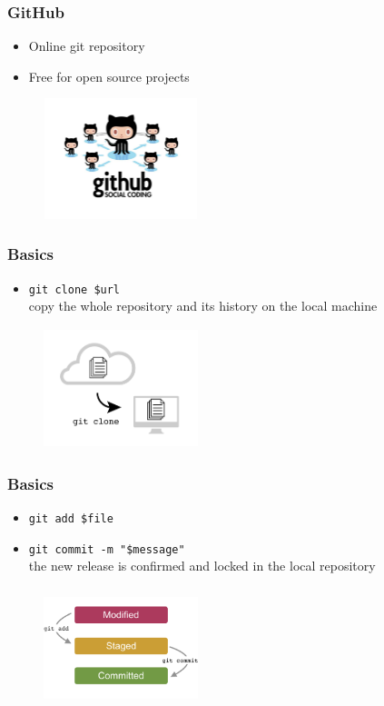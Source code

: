 \documentclass{beamer}
\begin{document}
\begin{frame}
\frametitle{GitHub}
\begin{itemize}
\item Online git repository
\item Free for open source projects
\end{itemize}
\begin{figure}
\centering
\includegraphics[height=3.5cm, width=4.5cm]{github_logo}
\end{figure}
\end{frame}

\begin{frame}[fragile]
\frametitle{Basics}
\begin{itemize}
\item \verb!git clone $url! \\ 
copy the whole repository and its history on the local machine
\end{itemize}
\begin{figure}
\centering
\includegraphics[height=3.5cm, width=4.5cm]{clone}
\end{figure}
\end{frame}

\begin{frame}[fragile]
\frametitle{Basics}
\begin{itemize}
\item \verb!git add $file! 
\item \verb!git commit -m "$message"! \\ 
the new release is confirmed and locked in the local repository
\end{itemize}
\begin{figure}
\centering
\includegraphics[height=3.5cm, width=4.5cm]{commit}
\end{figure}
\end{frame}
\end{document}
